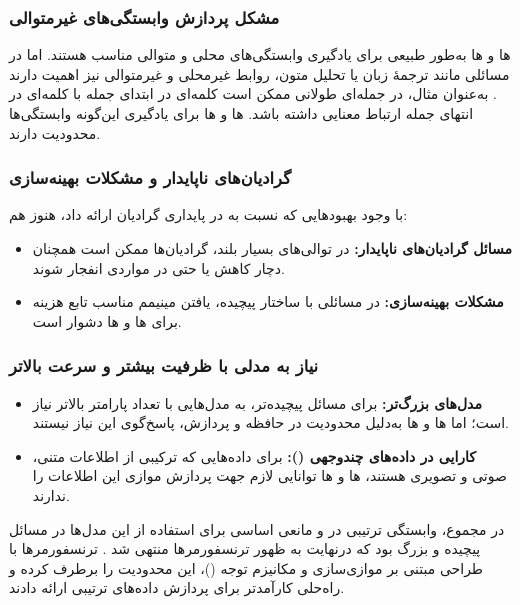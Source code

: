 \subsubsection{مشکل پردازش وابستگی‌های غیرمتوالی}
ها و ها به‌طور طبیعی برای یادگیری وابستگی‌های محلی و متوالی مناسب هستند. اما در مسائلی مانند ترجمهٔ زبان یا تحلیل متون، روابط غیرمحلی و غیرمتوالی نیز اهمیت دارند
\cite{bahdanau2014neural}.
به‌عنوان مثال، در جمله‌ای طولانی ممکن است کلمه‌ای در ابتدای جمله با کلمه‌ای در انتهای جمله ارتباط معنایی داشته باشد. ها و ها برای یادگیری این‌گونه وابستگی‌ها محدودیت دارند.

\subsubsection{گرادیان‌های ناپایدار و مشکلات بهینه‌سازی}
با وجود بهبودهایی که  نسبت به  در پایداری گرادیان ارائه داد، هنوز هم:
\begin{itemize}
	\item \textbf{مسائل گرادیان‌های ناپایدار:}  
	در توالی‌های بسیار بلند، گرادیان‌ها ممکن است همچنان دچار کاهش یا حتی در مواردی انفجار شوند.
	
	\item \textbf{مشکلات بهینه‌سازی:}  
	در مسائلی با ساختار پیچیده، یافتن مینیمم مناسب تابع هزینه برای ها و ها دشوار است.
\end{itemize}

\subsubsection{نیاز به مدلی با ظرفیت بیشتر و سرعت بالاتر}
\begin{itemize}
	\item \textbf{مدل‌های بزرگ‌تر:}  
	برای مسائل پیچیده‌تر، به مدل‌هایی با تعداد پارامتر بالاتر نیاز است؛ اما ها و ها به‌دلیل محدودیت در حافظه و پردازش، پاسخ‌گوی این نیاز نیستند.
	
	\item \textbf{کارایی در داده‌های چندوجهی ():}  
	برای داده‌هایی که ترکیبی از اطلاعات متنی، صوتی و تصویری هستند، ها و ها توانایی لازم جهت پردازش موازی این اطلاعات را ندارند.
\end{itemize}

در مجموع، وابستگی ترتیبی در  و  مانعی اساسی برای استفاده از این مدل‌ها در مسائل پیچیده و بزرگ بود که درنهایت به ظهور ترنسفورمرها منتهی شد
\cite{vaswani2017attention}.
ترنسفورمرها با طراحی مبتنی بر موازی‌سازی و مکانیزم توجه ()، این محدودیت را برطرف کرده و راه‌حلی کارآمدتر برای پردازش داده‌های ترتیبی ارائه دادند.



